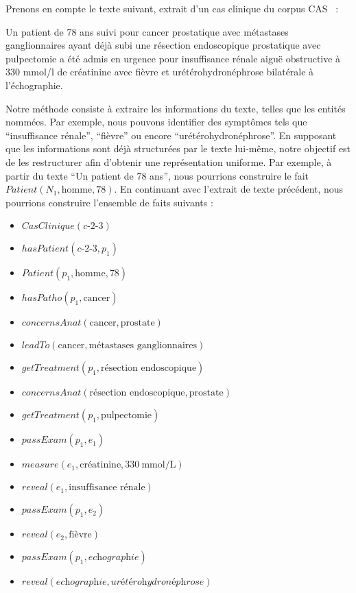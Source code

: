 \begin{example}
    \label{ex:runex}
    Prenons en compte le texte suivant, extrait d'un cas clinique du corpus CAS~\cite{grabarCASFrenchCorpus2018} :
    \begin{displayquote}
        Un patient de 78 ans suivi pour cancer prostatique avec métastases ganglionnaires ayant déjà subi une résection endoscopique prostatique avec pulpectomie a été admis en urgence pour insuffisance rénale aiguë obstructive à 330 mmol/l de créatinine avec fièvre et urétérohydronéphrose bilatérale à l'échographie.
    \end{displayquote}

    Notre méthode consiste à extraire les informations du texte, telles que les entités nommées.
    Par exemple, nous pouvons identifier des symptômes tels que \enquote{insuffisance rénale}, \enquote{fièvre} ou encore \enquote{urétérohydronéphrose}.
    En supposant que les informations sont déjà structurées par le texte lui-même, notre objectif est de les restructurer afin d'obtenir une représentation uniforme.
    Par exemple, à partir du texte \enquote{Un patient de 78 ans}, nous pourrions construire le fait $Patient(N_1, \text{homme}, 78)$.
    En continuant avec l'extrait de texte précédent, nous pourrions construire l'ensemble de faits suivants :
    \begin{multicols}{2}
        \begin{itemize}
            \item $CasClinique(\textit{c-2-3})$
            \item $hasPatient(\textit{c-2-3}, p_1)$
            \item $Patient(p_1, \text{homme}, 78)$
            \item $hasPatho(p_1, \text{cancer})$
            \item $concernsAnat(\text{cancer}, \text{prostate})$
            \item $leadTo(\text{cancer}, \text{métastases ganglionnaires})$
            \item $getTreatment(p_1, \text{résection endoscopique})$
            \item $concernsAnat(\text{résection endoscopique}, \text{prostate})$
            \item $getTreatment(p_1, \text{pulpectomie})$
            \item $passExam(p_1, e_1)$
            \item $measure(e_1, \text{créatinine}, \SI{330}{\milli\mol\per\L}) $
            \item $reveal(e_1, \text{insuffisance rénale})$
            \item $passExam(p_1, e_2)$
            \item $reveal(e_2, \text{fièvre})$
            \item $passExam(p_1, \textit{echographie})$
            \item $reveal(\textit{echographie}, \textit{urétérohydronéphrose})$
        \end{itemize}
    \end{multicols}


\end{example}
